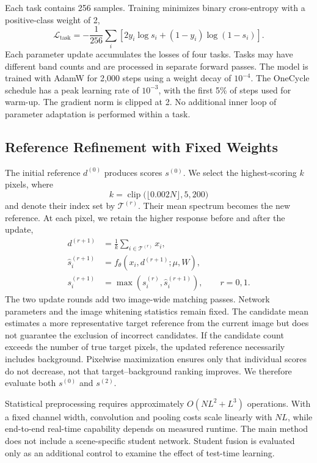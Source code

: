 \documentclass[a4paper,11pt]{article}
\newcommand{\clip}{\operatorname{clip}}
\begin{document}
Each task contains 256 samples. Training minimizes binary cross-entropy with a positive-class weight of 2,
\begin{equation}
\mathcal L_{\mathrm{task}}=-\frac{1}{256}\sum_i
\left[2y_i\log s_i+(1-y_i)\log(1-s_i)\right].
\end{equation}
Each parameter update accumulates the losses of four tasks. Tasks may have different band counts and are processed in separate forward passes. The model is trained with AdamW for 2,000 steps using a weight decay of $10^{-4}$. The OneCycle schedule has a peak learning rate of $10^{-3}$, with the first 5\% of steps used for warm-up. The gradient norm is clipped at 2. No additional inner loop of parameter adaptation is performed within a task.

\subsection{Reference Refinement with Fixed Weights}
The initial reference $d^{(0)}$ produces scores $s^{(0)}$. We select the highest-scoring $k$ pixels, where
\begin{equation}
k=\clip\big(\lfloor0.002N\rfloor,5,200\big)
\end{equation}
and denote their index set by $\mathcal T^{(r)}$. Their mean spectrum becomes the new reference. At each pixel, we retain the higher response before and after the update,
\begin{align}
d^{(r+1)}&=\frac{1}{k}\sum_{i\in\mathcal T^{(r)}}x_i,\\
\widehat s_i^{(r+1)}&=f_\theta(x_i,d^{(r+1)};\mu,W),\\
s_i^{(r+1)}&=\max\left(s_i^{(r)},\widehat s_i^{(r+1)}\right),\qquad r=0,1.
\end{align}
The two update rounds add two image-wide matching passes. Network parameters and the image whitening statistics remain fixed. The candidate mean estimates a more representative target reference from the current image but does not guarantee the exclusion of incorrect candidates. If the candidate count exceeds the number of true target pixels, the updated reference necessarily includes background. Pixelwise maximization ensures only that individual scores do not decrease, not that target--background ranking improves. We therefore evaluate both $s^{(0)}$ and $s^{(2)}$.

Statistical preprocessing requires approximately $O(NL^2+L^3)$ operations. With a fixed channel width, convolution and pooling costs scale linearly with $NL$, while end-to-end real-time capability depends on measured runtime. The main method does not include a scene-specific student network. Student fusion is evaluated only as an additional control to examine the effect of test-time learning.
\FloatBarrier
\end{document}
